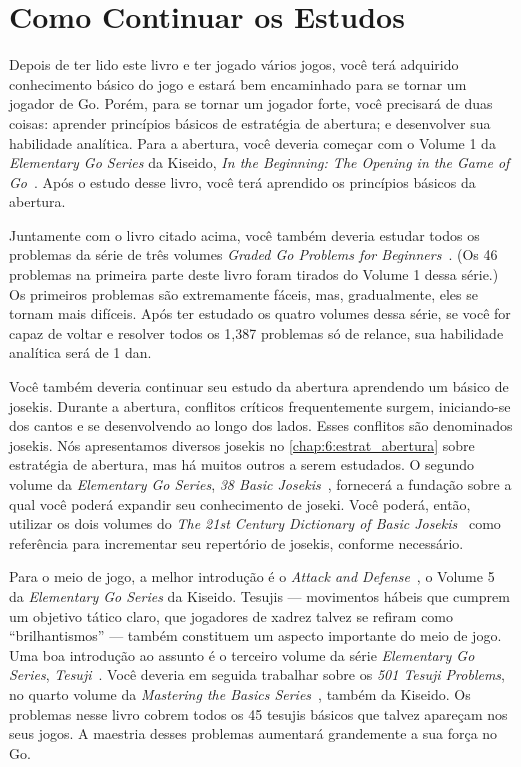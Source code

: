 \chapter{Como Continuar os Estudos}

Depois de ter lido este livro e ter jogado vários jogos, você terá adquirido conhecimento básico do jogo e estará bem encaminhado para se tornar um jogador de Go. Porém, para se tornar um jogador forte, você precisará de duas coisas: aprender princípios básicos de estratégia de abertura; e desenvolver sua habilidade analítica. Para a abertura, você deveria começar com o Volume 1 da \emph{Elementary Go Series} da Kiseido, \emph{In the Beginning: The Opening in the Game of Go}~\cite{ikure_in_the_beginning}. Após o estudo desse livro, você terá aprendido os princípios básicos da abertura.

Juntamente com o livro citado acima, você também deveria estudar todos os problemas da série de três volumes \emph{Graded Go Problems for Beginners}~\cite{yoshinori_bozulich_ggpb}. (Os 46 problemas na primeira parte deste livro foram tirados do Volume 1 dessa série.) Os primeiros problemas são extremamente fáceis, mas, gradualmente, eles se tornam mais difíceis. Após ter estudado os quatro volumes dessa série, se você for capaz de voltar e resolver todos os 1,387 problemas só de relance, sua habilidade analítica será de 1 dan.

Você também deveria continuar seu estudo da abertura aprendendo um básico de josekis. Durante a abertura, conflitos críticos frequentemente surgem, iniciando-se dos cantos e se desenvolvendo ao longo dos lados. Esses conflitos são denominados josekis. Nós apresentamos diversos josekis no \autoref{chap:6:estrat_abertura} sobre estratégia de abertura, mas há muitos outros a serem estudados. O segundo volume da \emph{Elementary Go Series}, \emph{38 Basic Josekis}~\cite{ishida_yoshio_basic_joseki_dictionary}, fornecerá a fundação sobre a qual você poderá expandir seu conhecimento de joseki. Você poderá, então, utilizar os dois volumes do \emph{The 21st Century Dictionary of Basic Josekis}~\cite{takao_shinji_21st_century_joseki_dictionary} como referência para incrementar seu repertório de josekis, conforme necessário.

Para o meio de jogo, a melhor introdução é o \emph{Attack and Defense}~\cite{ishida_akira_james_davies}, o Volume 5 da \emph{Elementary Go Series} da Kiseido. Tesujis --- movimentos hábeis que cumprem um objetivo tático claro, que jogadores de xadrez talvez se refiram como ``brilhantismos'' --- também constituem um aspecto importante do meio de jogo. Uma boa introdução ao assunto é o terceiro volume da série \emph{Elementary Go Series}, \emph{Tesuji}~\cite{davies_tesuji}. Você deveria em seguida trabalhar sobre os \emph{501 Tesuji Problems}, no quarto volume da \emph{Mastering the Basics Series}~\cite{bozulich_501_tesuji}, também da Kiseido. Os problemas nesse livro cobrem todos os 45 tesujis básicos que talvez apareçam nos seus jogos. A maestria desses problemas aumentará grandemente a sua força no Go.

